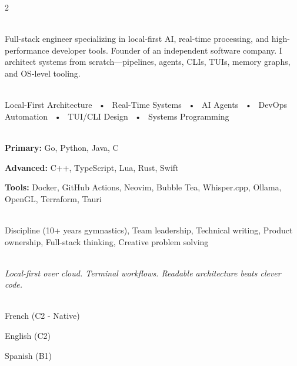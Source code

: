 \documentclass[lighthipster]{simplehipstercv}
\begin{document}
\begin{paracol}{2}

\paracolbackgroundoptions

\footnotesize
{\setasidefontcolour
\flushleft

\vspace{1em}

\\[0.5em]

{\footnotesize
Full-stack engineer specializing in local-first AI, real-time processing, and high-performance developer tools. Founder of an independent software company. I architect systems from scratch—pipelines, agents, CLIs, TUIs, memory graphs, and OS-level tooling.}
\bigskip

 \\[0.5em]

Local-First Architecture ~•~
Real-Time Systems ~•~
AI Agents ~•~
DevOps Automation ~•~
TUI/CLI Design ~•~
Systems Programming

\bigskip

\\[0.5em]

\textbf{Primary:}
Go, Python, Java, C

\textbf{Advanced:}
C++, TypeScript, Lua, Rust, Swift

\textbf{Tools:}
Docker, GitHub Actions, Neovim, Bubble Tea, Whisper.cpp, Ollama, OpenGL, Terraform, Tauri

\bigskip

\\[0.5em]

Discipline (10+ years gymnastics), Team leadership, Technical writing, Product ownership, Full-stack thinking, Creative problem solving

\bigskip

\\[0.5em]

{\footnotesize\textit{Local-first over cloud. Terminal workflows. Readable architecture beats clever code.}}

\bigskip

\\[0.5em]

French (C2 - Native)

English (C2)

Spanish (B1)

}
\end{paracol}
\end{document}
